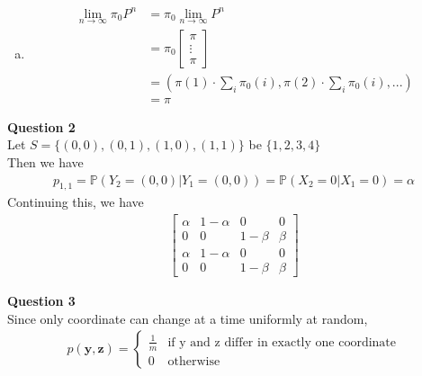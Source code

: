 \documentclass[12pt, letterpaper]{article}
\begin{document}
\begin{enumerate}[a.]
\begin{align*}
    a = c &= \frac 27 \\
    \pi &= \begin{bmatrix}
        \frac 27 & \frac 37 & \frac 27
    \end{bmatrix}
    \end{align*}
    \item \begin{align*}
        \lim_{n\rightarrow\infty}\pi_0P^n &= \pi_0 \lim_{n\rightarrow\infty} P^n \\
        &= \pi_0 \begin{bmatrix}
            \pi \\ \vdots \\ \pi
        \end{bmatrix} \\
        &= \left(\pi(1)\cdot \sum_{i} \pi_0(i), \pi(2)\cdot \sum_{i}\pi_0(i),...\right) \\
        &= \pi
    \end{align*}
\end{enumerate}

\noindent \textbf{Question 2} \\
Let $S = \{(0,0),(0,1),(1,0),(1,1)\}$ be $\{1,2,3,4\}$ \\
Then we have 
\begin{align*}
    p_{1,1} = \mathbb{P}(Y_2=(0,0) | Y_1=(0,0)) = \mathbb{P}(X_2 = 0 | X_1 = 0) = \alpha 
\end{align*}
Continuing this, we have
\begin{align*}
    \begin{bmatrix}
        \alpha & 1-\alpha & 0 & 0 \\
        0 & 0 & 1-\beta & \beta \\
        \alpha & 1-\alpha & 0 & 0\\
        0 & 0 & 1-\beta & \beta
    \end{bmatrix}
\end{align*}

\noindent \textbf{Question 3} \\
Since only coordinate can change at a time uniformly at random,
\begin{align*}
    p(\mathbf{y},\mathbf{z}) = \begin{cases}
        \frac 1m & \text{if y and z differ in exactly one coordinate} \\
        0 & \text{otherwise}
    \end{cases}
\end{align*}
\end{document}
